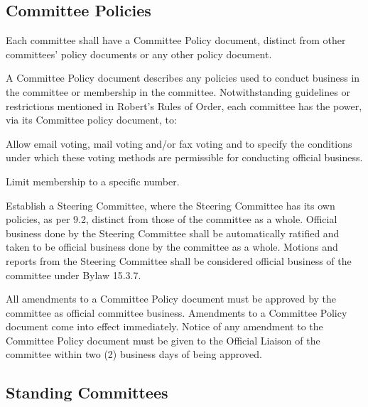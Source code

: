\subsection{Committee Policies}
\begin{longenum}[ label*=\thesubsection.\arabic*., align=left]
	\item Each committee shall have a Committee Policy document, distinct from other committees' policy documents or any other policy document. 
    \item A Committee Policy document describes any policies used to conduct business in the committee or membership in the committee. Notwithstanding guidelines or restrictions mentioned in Robert's Rules of Order, each committee has the power, via its Committee policy document, to:
    \begin{longenum}[ label*=\arabic*., align=left]
		\item Allow email voting, mail voting and/or fax voting and to specify the conditions under which these voting methods are permissible for conducting official business. 
        \item Limit membership to a specific number.
        \item Establish a Steering Committee, where the Steering Committee has its own policies, as per 9.2, distinct from those of the committee as a whole. Official business done by the Steering Committee shall be automatically ratified and taken to be official business done by the committee as a whole. Motions and reports from the Steering Committee shall be considered official business of the committee under Bylaw 15.3.7.
	\end{longenum}
    \item All amendments to a Committee Policy document must be approved by the committee as official committee business. Amendments to a Committee Policy document come into effect immediately. Notice of any amendment to the Committee Policy document must be given to the Official Liaison of the committee within two (2) business days of being approved.
\end{longenum}

\subsection{Standing Committees}

    
